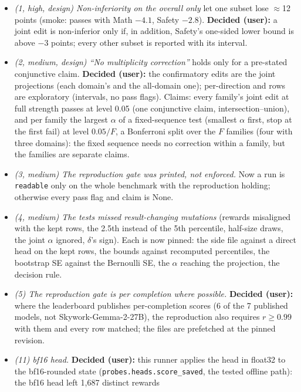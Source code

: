 \documentclass{article}
\begin{document}
\begin{itemize}
  \item \emph{(1, high, design) Non-inferiority on the overall only} let one subset lose $\approx$12 points (smoke:
        passes with Math $-4.1$, Safety $-2.8$). \textbf{Decided (user):} a joint edit is non-inferior only if, in
        addition, Safety's one-sided lower bound is above $-3$ points; every other subset is reported with its interval.
  \item \emph{(2, medium, design) ``No multiplicity correction''} holds only for a pre-stated conjunctive claim.
        \textbf{Decided (user):} the confirmatory edits are the joint projections (each domain's and the all-domain one);
        per-direction and \leace{} rows are exploratory (intervals, no pass flags). Claims: every family's joint edit at
        full strength passes at level 0.05 (one conjunctive claim, intersection--union), and per family the largest
        $\alpha$ of a fixed-sequence test (smallest $\alpha$ first, stop at the first fail) at level $0.05/F$, a
        Bonferroni split over the $F$ families (four with three domains): the fixed sequence needs no correction within a
        family, but the families are separate claims.
  \item \emph{(3, medium) The reproduction gate was printed, not enforced.} Now a run is \texttt{readable} only on the
        whole benchmark with the reproduction holding; otherwise every pass flag and claim is None.
  \item \emph{(4, medium) The tests missed result-changing mutations} (rewards misaligned with the kept rows, the
        2.5th instead of the 5th percentile, half-size draws, the joint $\alpha$ ignored, $\delta$'s sign). Each is now
        pinned: the side file against a direct head on the kept rows, the bounds against recomputed percentiles, the
        bootstrap SE against the Bernoulli SE, the $\alpha$ reaching the projection, the decision rule.
  \item \emph{(5) The reproduction gate is per completion where possible.} \textbf{Decided (user):} where the
        leaderboard publishes per-completion scores (6 of the 7 published models, not Skywork-Gemma-2-27B), the
        reproduction also requires $r \ge 0.99$ with them and every row matched; the files are prefetched at the pinned
        revision.
  \item \emph{(11) bf16 head.} \textbf{Decided (user):} this runner applies the head in float32 to the bf16-rounded
        state (\texttt{probes.heads.score\_saved}, the tested offline path): the bf16 head left 1{,}687 distinct rewards

\end{itemize}
\end{document}
